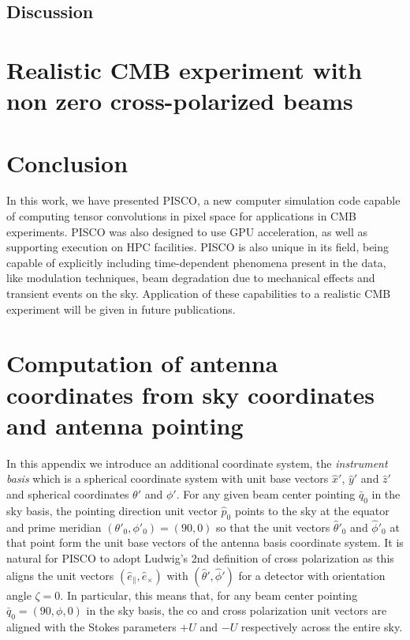 \documentclass[a4paper,11pt]{article}
\newcommand{\co}{\mathbin{\|}}
\newcommand{\cx}{\mathbin{\times}}
\begin{document}


\subsection{Discussion}

\section{Realistic CMB experiment with non zero cross-polarized beams}

\section{Conclusion}
\label{sec::conclusions}

In this work, we have presented PISCO, a new computer simulation code capable of computing tensor convolutions in pixel space for applications in CMB experiments. PISCO was also designed to use GPU acceleration, as well as supporting execution on HPC facilities. PISCO is also unique in its field, being capable of explicitly including time-dependent phenomena present in the data, like modulation techniques, beam degradation due to mechanical effects and transient events on the sky. Application of these capabilities to a realistic CMB experiment will be given in future publications.




\appendix
\section{Computation of antenna coordinates from sky coordinates and antenna pointing}

In this appendix we introduce an additional coordinate system, the \textsl{instrument basis} which is a spherical coordinate system with unit base vectors $\hat{x}'$, $\hat{y}'$ and $\hat{z}'$ and spherical coordinates $\theta'$ and $\phi'$. For any given beam center pointing $\bar{q}_0$ in the sky basis, the pointing direction unit vector $\hat{p}_0$ points to the sky at the equator and prime meridian $(\theta'_0,\phi'_0) = (90,0)$ so that the unit vectors $\hat{\theta}'_0$ and $\hat{\phi}'_0$ at that point form the unit base vectors of the antenna basis coordinate system. It is natural for PISCO to adopt Ludwig's 2nd definition of cross polarization \cite{1140406} as this aligns the unit vectors $(\hat{e}_{\co},\hat{e}_{\cx})$ with $(\hat{\theta}',\hat{\phi}')$ for a detector with orientation angle $\zeta = 0$. In particular, this means that, for any beam center pointing $\bar{q}_0 = (90,\phi,0)$ in the sky basis, the co and cross polarization unit vectors are aligned with the Stokes parameters $+U$ and $-U$ respectively across the entire sky.
\end{document}
